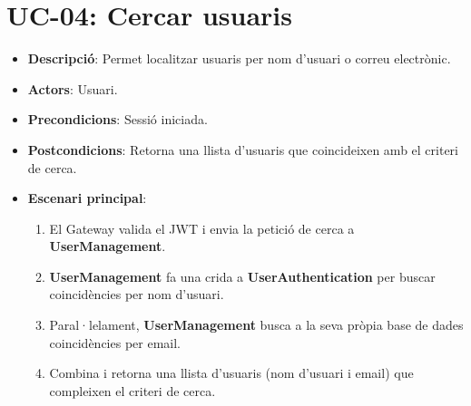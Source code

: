\section{UC-04: Cercar usuaris}
\begin{itemize}
    \item \textbf{Descripció}: Permet localitzar usuaris per nom d'usuari o correu electrònic.
    \item \textbf{Actors}: Usuari.
    \item \textbf{Precondicions}: Sessió iniciada.
    \item \textbf{Postcondicions}: Retorna una llista d'usuaris que coincideixen amb el criteri de cerca.
    \item \textbf{Escenari principal}:
    \begin{enumerate}
        \item El Gateway valida el JWT i envia la petició de cerca a \textbf{UserManagement}.
        \item \textbf{UserManagement} fa una crida a \textbf{UserAuthentication} per buscar coincidències per nom d'usuari.
        \item Paral·lelament, \textbf{UserManagement} busca a la seva pròpia base de dades coincidències per email.
        \item Combina i retorna una llista d'usuaris (nom d'usuari i email) que compleixen el criteri de cerca.
    \end{enumerate}
\end{itemize}


